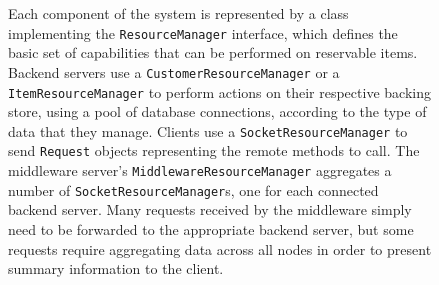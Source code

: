 \documentclass[letterpaper,11pt]{article}
\makeatletter
\newenvironment{customlegend}[1][]{%
    \begingroup
    \csname pgfplots@init@cleared@structures\endcsname
    \pgfplotsset{#1}%
}{%
    \csname pgfplots@createlegend\endcsname
    \endgroup
}%
\def\addlegendimage{\csname pgfplots@addlegendimage\endcsname}
\makeatother
\begin{document}
\begin{figure}[H]
    \centering


    \caption{
        Each component of the system is represented by a class implementing the
        \texttt{ResourceManager} interface, which defines the basic set of
        capabilities that can be performed on reservable items.
        Backend servers use a \texttt{CustomerResourceManager} or a
        \texttt{ItemResourceManager} to perform actions on their respective
        backing store, using a pool of database connections, according to the
        type of data that they manage.
        Clients use a \texttt{SocketResourceManager} to send \texttt{Request}
        objects representing the remote methods to call.
        The middleware server's \texttt{MiddlewareResourceManager} aggregates a
        number of \texttt{SocketResourceManager}s, one for each connected
        backend server.  Many requests received by the middleware simply need
        to be forwarded to the appropriate backend server, but some requests
        require aggregating data across all nodes in order to present summary
        information to the client.
    }
\end{figure}
\end{document}
